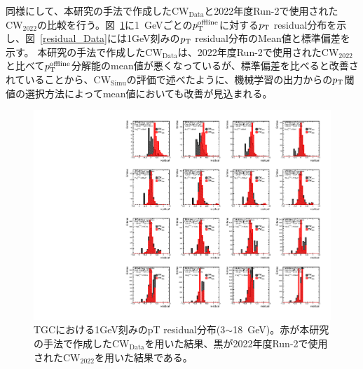 同様にして、本研究の手法で作成した$\mathrm{CW_{Data}}$と2022年度Run-2で使用された$\mathrm{CW_{2022}}$の比較を行う。図~\ref{residual_Data_3_18}に1~GeVごとの$p_{\rm{T}}^{\rm{offline}}$に対する$p_{\rm{T}}$ residual分布を示し、図~\ref{residual_Data}には1GeV刻みの$p_{\rm{T}}$ residual分布のMean値と標準偏差を示す。
本研究の手法で作成した$\mathrm{CW_{Data}}$は、2022年度Run-2で使用された$\mathrm{CW_{2022}}$と比べて$p_{\rm{T}}^{\rm{offline}}$分解能のmean値が悪くなっているが、標準偏差を比べると改善されていることから、$\mathrm{CW_{Simu}}$の評価で述べたように、機械学習の出力からの$p_{\rm{T}}$閾値の選択方法によってmean値においても改善が見込まれる。
\begin{figure}[htbp]
  \centering
  \hspace*{-1cm}
  \includegraphics[clip, width=16cm]{fig/5/residual_Data_3_18.pdf}
  \caption{TGCにおける1GeV刻みのpT residual分布(3$\sim$18~GeV)。赤が本研究の手法で作成した$\mathrm{CW_{Data}}$を用いた結果、黒が2022年度Run-2で使用された$\mathrm{CW_{2022}}$を用いた結果である。}
  \label{residual_Data_3_18}
\end{figure}




